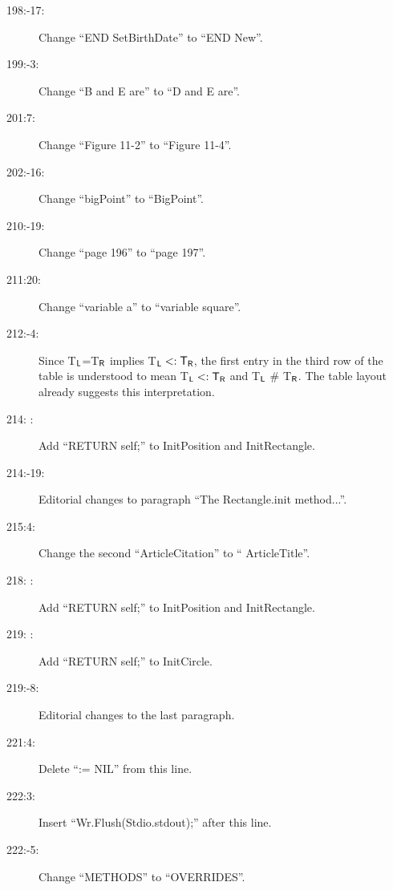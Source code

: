 \begin{description}
\item[198:-17:] Change ``{\sf END SetBirthDate}'' to ``{\sf END New}''.

\item[199:-3:] Change ``{\sf B} and {\sf E} are'' to ``{\sf D} and {\sf E} are''.

\item[201:7:] Change ``Figure 11-2'' to ``Figure 11-4''.

\item[202:-16:] Change ``{\sf bigPoint}'' to ``{\sf BigPoint}''.

\item[210:-19:] Change ``page 196'' to ``page 197''.

\item[211:20:] Change ``variable {\sf a}'' to ``variable {\sf square}''.

\item[212:-4:] Since {\sf T$_{\sf L}$=T$_{\sf R}$}
implies {\sf T$_{\sf L}<:{\sf T}_{\sf R}$},
the first entry in the third row of 
the table is understood to mean {\sf T$_{\sf L}<:{\sf T}_{\sf R}$} and
{\sf T$_{\sf L}$} \# {\sf T$_{\sf R}$}. The table layout 
already suggests this interpretation.

\item[214: :] Add ``{\sf RETURN self;}''
to {\sf InitPosition} and {\sf InitRectangle}.

\item[214:-19:] Editorial changes to paragraph ``The {\sf Rectangle.init}
method...''.

\item[215:4:] Change the second ``{\sf ArticleCitation}'' to ``{\sf
ArticleTitle}''.

\item[218: :] Add ``{\sf RETURN self;}'' to {\sf InitPosition}
and {\sf InitRectangle}.

\item[219: :] Add ``{\sf RETURN self;}'' to {\sf InitCircle}.

\item[219:-8:] Editorial changes to the last paragraph.

\item[221:4:] Delete ``{\sf:= NIL}'' from this line.

\item[222:3:] Insert ``{\sf Wr.Flush(Stdio.stdout);}'' after this line.

\item[222:-5:] Change ``{\sf METHODS}'' to ``{\sf OVERRIDES}''.


\end{description}
